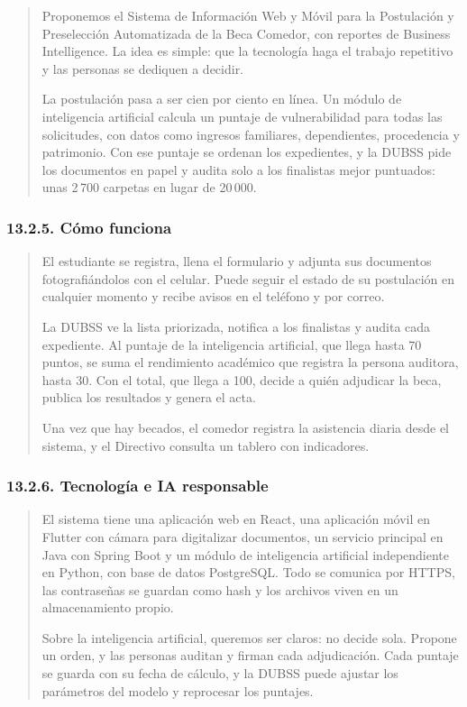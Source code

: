 \begin{quote}
Proponemos el Sistema de Información Web y Móvil para la Postulación y Preselección Automatizada de la Beca Comedor, con reportes de Business Intelligence. La idea es simple: que la tecnología haga el trabajo repetitivo y las personas se dediquen a decidir.

La postulación pasa a ser cien por ciento en línea. Un módulo de inteligencia artificial calcula un puntaje de vulnerabilidad para todas las solicitudes, con datos como ingresos familiares, dependientes, procedencia y patrimonio. Con ese puntaje se ordenan los expedientes, y la DUBSS pide los documentos en papel y audita solo a los finalistas mejor puntuados: unas 2\,700 carpetas en lugar de 20\,000.
\end{quote}

\subsubsection{13.2.5. Cómo funciona}

\begin{quote}
El estudiante se registra, llena el formulario y adjunta sus documentos fotografiándolos con el celular. Puede seguir el estado de su postulación en cualquier momento y recibe avisos en el teléfono y por correo.

La DUBSS ve la lista priorizada, notifica a los finalistas y audita cada expediente. Al puntaje de la inteligencia artificial, que llega hasta 70 puntos, se suma el rendimiento académico que registra la persona auditora, hasta 30. Con el total, que llega a 100, decide a quién adjudicar la beca, publica los resultados y genera el acta.

Una vez que hay becados, el comedor registra la asistencia diaria desde el sistema, y el Directivo consulta un tablero con indicadores.
\end{quote}

\subsubsection{13.2.6. Tecnología e IA responsable}

\begin{quote}
El sistema tiene una aplicación web en React, una aplicación móvil en Flutter con cámara para digitalizar documentos, un servicio principal en Java con Spring Boot y un módulo de inteligencia artificial independiente en Python, con base de datos PostgreSQL. Todo se comunica por HTTPS, las contraseñas se guardan como hash y los archivos viven en un almacenamiento propio.

Sobre la inteligencia artificial, queremos ser claros: no decide sola. Propone un orden, y las personas auditan y firman cada adjudicación. Cada puntaje se guarda con su fecha de cálculo, y la DUBSS puede ajustar los parámetros del modelo y reprocesar los puntajes.
\end{quote}

